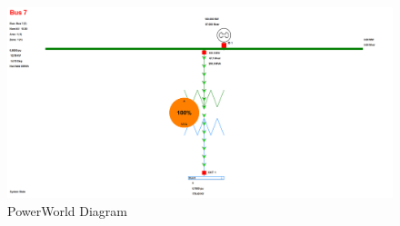 \documentclass[12pt]{article}
\begin{document}
        \begin{figure}[H]
            \centerline{\includegraphics[scale=0.25]{images/PowerWorldBus7}}
            \caption{PowerWorld Diagram}
        \end{figure}
\end{document}
